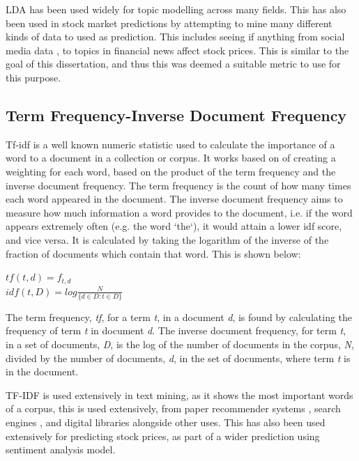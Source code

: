 LDA has been used widely for topic modelling across many fields.  This has also been used in stock market predictions by attempting to mine many different kinds of data to used as prediction. This includes seeing if anything from social media data \cite{nguyen2015sentiment}, to topics in financial news \cite{feuerriegel2016analysis} affect stock prices. This is similar to the goal of this dissertation, and thus this was deemed a suitable metric to use for this purpose. 
 \subsection{Term Frequency-Inverse Document Frequency}
 Tf-idf is a well known numeric statistic used to calculate the importance of a word to a document in a collection or corpus. It works based on of creating a weighting for each word, based on the product of the term frequency and the inverse document frequency. The term frequency is the count of how many times each word appeared in the document. The inverse document frequency aims to measure how much information a word provides to the document, i.e. if the word appears extremely often (e.g. the word `the`), it would attain a lower idf score, and vice versa. It is calculated by taking the logarithm of the inverse of the fraction of documents which contain that word. This is shown below:
 
 \begin{center}
 	$tf(t,d) = f_{t,d}$\\
 	$idf(t, D) = log\frac{N}{\{d \in D : t \in D\}}$
 \end{center}
 
The term frequency, \textit{tf}, for a term \textit{t}, in a document \textit{d}, is found by calculating the frequency of term \textit{t} in document \textit{d}. The inverse document frequency, for term \textit{t}, in a set of documents, \textit{D}, is the log of the number of documents in the corpus, \textit{N},  divided by the number of documents, \textit{d}, in the set of documents, where term \textit{t} is in the document.  
 
 TF-IDF is used extensively in text mining, as it shows the most important words of a corpus, this is used extensively, from paper recommender systems \cite{beel2016paper}, search engines \cite{xu2014pos}, and digital libraries \cite{philip2014application} alongside other uses. This has also been used extensively for predicting stock prices, as part of a wider prediction using sentiment analysis model. 
 

